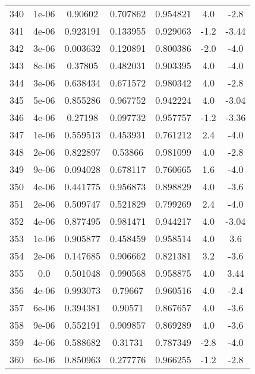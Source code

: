\begin{table}
\begin{tabular}{c|c|c|c|c|c|c}
340 & 1e-06 & 0.90602 & 0.707862 & 0.954821 & 4.0 & -2.8\\
341 & 4e-06 & 0.923191 & 0.133955 & 0.929063 & -1.2 & -3.44\\
342 & 3e-06 & 0.003632 & 0.120891 & 0.800386 & -2.0 & -4.0\\
343 & 8e-06 & 0.37805 & 0.482031 & 0.903395 & 4.0 & -4.0\\
344 & 3e-06 & 0.638434 & 0.671572 & 0.980342 & 4.0 & -2.8\\
345 & 5e-06 & 0.855286 & 0.967752 & 0.942224 & 4.0 & -3.04\\
346 & 4e-06 & 0.27198 & 0.097732 & 0.957757 & -1.2 & -3.36\\
347 & 1e-06 & 0.559513 & 0.453931 & 0.761212 & 2.4 & -4.0\\
348 & 2e-06 & 0.822897 & 0.53866 & 0.981099 & 4.0 & -2.8\\
349 & 9e-06 & 0.094028 & 0.678117 & 0.760665 & 1.6 & -4.0\\
350 & 4e-06 & 0.441775 & 0.956873 & 0.898829 & 4.0 & -3.6\\
351 & 2e-06 & 0.509747 & 0.521829 & 0.799269 & 2.4 & -4.0\\
352 & 4e-06 & 0.877495 & 0.981471 & 0.944217 & 4.0 & -3.04\\
353 & 1e-06 & 0.905877 & 0.458459 & 0.958514 & 4.0 & 3.6\\
354 & 2e-06 & 0.147685 & 0.906662 & 0.821381 & 3.2 & -3.6\\
355 & 0.0 & 0.501048 & 0.990568 & 0.958875 & 4.0 & 3.44\\
356 & 4e-06 & 0.993073 & 0.79667 & 0.960516 & 4.0 & -2.4\\
357 & 6e-06 & 0.394381 & 0.90571 & 0.867657 & 4.0 & -3.6\\
358 & 9e-06 & 0.552191 & 0.909857 & 0.869289 & 4.0 & -3.6\\
359 & 4e-06 & 0.588682 & 0.31731 & 0.787349 & -2.8 & -4.0\\
360 & 6e-06 & 0.850963 & 0.277776 & 0.966255 & -1.2 & -2.8\\
\end{tabular}
\end{table}
\newpage
